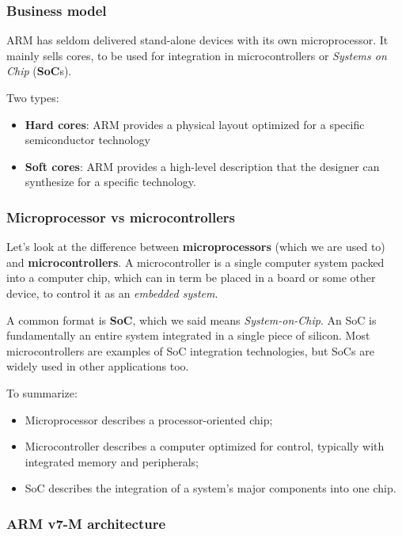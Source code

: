 \documentclass[a4paper,11pt]{article}
\begin{document}
\subsubsection{Business model}

ARM has seldom delivered stand-alone devices with its own microprocessor.
It mainly sells cores, to be used for integration in microcontrollers or \textit{Systems on
	Chip} (\textbf{SoC}s).

Two types:
\begin{itemize}
	\item \textbf{Hard cores}: ARM provides a physical layout optimized for a specific semiconductor technology
	\item \textbf{Soft cores}: ARM provides a high-level description that the designer can synthesize for a specific technology.
\end{itemize}

\subsubsection{Microprocessor vs microcontrollers}

Let's look at the difference between \textbf{microprocessors} (which we are used to) and \textbf{microcontrollers}.
A microcontroller is a single computer system packed into a computer chip, which can in term be placed in a board or some other device, to control it as an \textit{embedded system}.

A common format is \textbf{SoC}, which we said means \textit{System-on-Chip}.
An SoC is fundamentally an entire system integrated in a single piece of silicon.
Most microcontrollers are examples of SoC integration technologies, but SoCs are widely used in other applications too.

To summarize:
\begin{itemize}
	\item Microprocessor describes a processor-oriented chip;
	\item Microcontroller describes a computer optimized for control, typically with integrated memory and peripherals;
	\item SoC describes the integration of a system's major components into one chip.
\end{itemize}

\subsubsection{ARM v7-M architecture}
\end{document}
